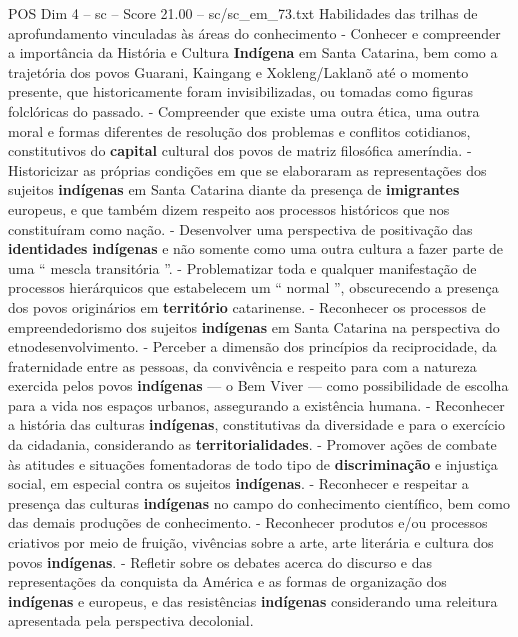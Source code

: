 \begin{textsample}{POS Dim 4 – sc – Score 21.00 – sc/sc\_em\_73.txt}
Habilidades das trilhas de aprofundamento vinculadas às áreas do conhecimento - Conhecer e compreender a importância da História e Cultura \textbf{Indígena} em Santa Catarina, bem como a trajetória dos povos Guarani, Kaingang e Xokleng/Laklanõ até o momento presente, que historicamente foram invisibilizadas, ou tomadas como figuras folclóricas do passado. - Compreender que existe uma outra ética, uma outra moral e formas diferentes de resolução dos problemas e conflitos cotidianos, constitutivos do \textbf{capital} cultural dos povos de matriz filosófica ameríndia. - Historicizar as próprias condições em que se elaboraram as representações dos sujeitos \textbf{indígenas} em Santa Catarina diante da presença de \textbf{imigrantes} europeus, e que também dizem respeito aos processos históricos que nos constituíram como nação. - Desenvolver uma perspectiva de positivação das \textbf{identidades} \textbf{indígenas} e não somente como uma outra cultura a fazer parte de uma “ mescla transitória ”. - Problematizar toda e qualquer manifestação de processos hierárquicos que estabelecem um “ normal ”, obscurecendo a presença dos povos originários em \textbf{território} catarinense. - Reconhecer os processos de empreendedorismo dos sujeitos \textbf{indígenas} em Santa Catarina na perspectiva do etnodesenvolvimento. - Perceber a dimensão dos princípios da reciprocidade, da fraternidade entre as pessoas, da convivência e respeito para com a natureza exercida pelos povos \textbf{indígenas} — o Bem Viver — como possibilidade de escolha para a vida nos espaços urbanos, assegurando a existência humana. - Reconhecer a história das culturas \textbf{indígenas}, constitutivas da diversidade e para o exercício da cidadania, considerando as \textbf{territorialidades}. - Promover ações de combate às atitudes e situações fomentadoras de todo tipo de \textbf{discriminação} e injustiça social, em especial contra os sujeitos \textbf{indígenas}. - Reconhecer e respeitar a presença das culturas \textbf{indígenas} no campo do conhecimento científico, bem como das demais produções de conhecimento. - Reconhecer produtos e/ou processos criativos por meio de fruição, vivências sobre a arte, arte literária e cultura dos povos \textbf{indígenas}. - Refletir sobre os debates acerca do discurso e das representações da conquista da América e as formas de organização dos \textbf{indígenas} e europeus, e das resistências \textbf{indígenas} considerando uma releitura apresentada pela perspectiva decolonial.

\end{textsample}
